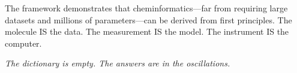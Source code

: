 \documentclass[11pt,twocolumn,a4paper]{article}
\theoremstyle{definition}
\theoremstyle{remark}
\begin{document}
The framework demonstrates that cheminformatics---far from requiring large datasets and millions of parameters---can be derived from first principles. The molecule IS the data. The measurement IS the model. The instrument IS the computer.

\medskip
\noindent\textit{The dictionary is empty. The answers are in the oscillations.}



\end{document}
